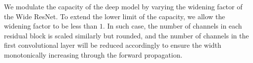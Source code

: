 



We modulate the capacity of the deep model by varying the widening factor of the Wide ResNet. To extend the lower limit of the capacity, we allow the widening factor to be less than $1$. In such case, the number of channels in each residual block is scaled similarly but rounded, and the number of channels in the first convolutional layer will be reduced accordingly to ensure the width monotonically increasing through the forward propagation. 


